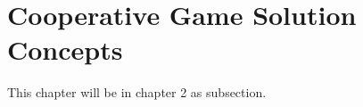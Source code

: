\setcounter{chapter}{3}

\chapter{Cooperative Game Solution Concepts}

This chapter will be in chapter 2 as subsection.









